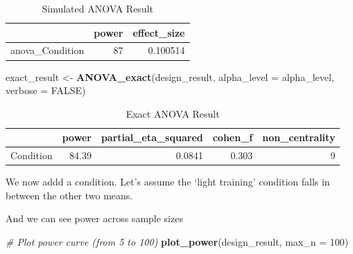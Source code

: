 \documentclass[]{book}
\newenvironment{Shaded}{\begin{snugshade}}{\end{snugshade}}
\newcommand{\CommentTok}[1]{\textcolor[rgb]{0.56,0.35,0.01}{\textit{#1}}}
\newcommand{\DataTypeTok}[1]{\textcolor[rgb]{0.13,0.29,0.53}{#1}}
\newcommand{\DecValTok}[1]{\textcolor[rgb]{0.00,0.00,0.81}{#1}}
\newcommand{\KeywordTok}[1]{\textcolor[rgb]{0.13,0.29,0.53}{\textbf{#1}}}
\newcommand{\NormalTok}[1]{#1}
\newcommand{\OtherTok}[1]{\textcolor[rgb]{0.56,0.35,0.01}{#1}}
\newcommand{\StringTok}[1]{\textcolor[rgb]{0.31,0.60,0.02}{#1}}
\begin{document}
\begin{table}[t]

\caption{\label{tab:unnamed-chunk-172}Simulated ANOVA Result}
\centering
\begin{tabular}{l|r|r}
\hline
  & power & effect\_size\\
\hline
anova\_Condition & 87 & 0.100514\\
\hline
\end{tabular}
\end{table}

\begin{Shaded}
\begin{Highlighting}[]
\NormalTok{exact_result <-}\StringTok{ }\KeywordTok{ANOVA_exact}\NormalTok{(design_result,}
                            \DataTypeTok{alpha_level =}\NormalTok{ alpha_level,}
                            \DataTypeTok{verbose =} \OtherTok{FALSE}\NormalTok{)}
\end{Highlighting}
\end{Shaded}

\begin{table}[t]

\caption{\label{tab:unnamed-chunk-174}Exact ANOVA Result}
\centering
\begin{tabular}{l|r|r|r|r}
\hline
  & power & partial\_eta\_squared & cohen\_f & non\_centrality\\
\hline
Condition & 84.39 & 0.0841 & 0.303 & 9\\
\hline
\end{tabular}
\end{table}

We now addd a condition. Let's assume the `light training' condition falls in between the other two means.

And we can see power across sample sizes

\begin{Shaded}
\begin{Highlighting}[]
\CommentTok{# Plot power curve (from 5 to 100)}
\KeywordTok{plot_power}\NormalTok{(design_result, }\DataTypeTok{max_n =} \DecValTok{100}\NormalTok{)}
\end{Highlighting}
\end{Shaded}
\end{document}
